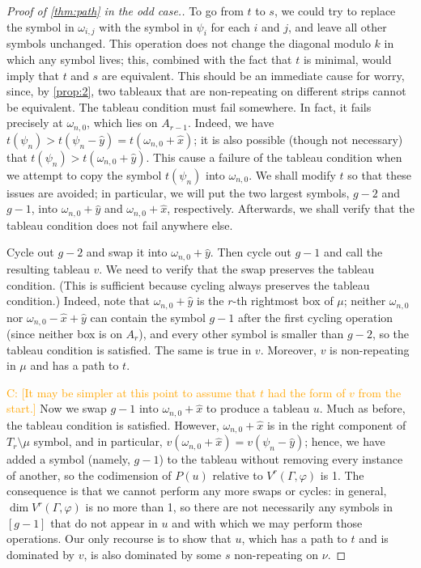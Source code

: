 \documentclass[11pt,reqno]{amsart}
\newcommand{\caelan}[1]{\textcolor{orange}{\sf C: [#1]}}
\theoremstyle{definition}
\theoremstyle{problem}
\theoremstyle{plain}
\theoremstyle{remark}
\theoremstyle{theorem}
\numberwithin{equation}{section}
\numberwithin{figure}{section}
\theoremstyle{definition}
\theoremstyle{problem}
\theoremstyle{plain}
\begin{document}
\begin{proof}[Proof of \cref{thm:path} in the odd case.]
  To go from $t$ to $s$, we could try to replace the symbol in
  $\omega_{i,j}$ with the symbol in $\psi_i$ for each $i$ and $j$, and
  leave all other symbols unchanged.  This operation does not change
  the diagonal modulo $k$ in which any symbol lives; this, combined
  with the fact that $t$ is minimal, would imply that $t$ and $s$ are
  equivalent.  This should be an immediate cause for worry, since, by
  \cref{prop:2}, two tableaux that are non-repeating on different
  strips cannot be equivalent.  The tableau condition must fail
  somewhere.  In fact, it fails precisely at $\omega_{n,0}$, which
  lies on $A_{r-1}$.  Indeed, we have
  $t(\psi_n) > t(\psi_n - \hat y) = t(\omega_{n,0}+ \hat x)$; it is
  also possible (though not necessary) that
  $t(\psi_n) > t(\omega_{n,0} + \hat y)$.  This cause a failure of the
  tableau condition when we attempt to copy the symbol $t(\psi_n)$
  into $\omega_{n,0}$.  We shall modify $t$ so that these issues are
  avoided; in particular, we will put the two largest symbols, $g-2$
  and $g-1$, into $\omega_{n,0} + \hat y$ and $\omega_{n,0} + \hat x$,
  respectively.  Afterwards, we shall verify that the tableau
  condition does not fail anywhere else.

  Cycle out $g-2$ and swap it into $\omega_{n,0} + \hat y$.  Then
  cycle out $g-1$ and call the resulting tableau $v$.  We need to
  verify that the swap preserves the tableau condition.  (This is
  sufficient because cycling always preserves the tableau condition.)
  Indeed, note that $\omega_{n,0} + \hat y$ is the $r$-th rightmost
  box of $\mu$; neither $\omega_{n,0}$ nor
  $\omega_{n,0} - \hat x + \hat y$ can contain the symbol $g-1$ after
  the first cycling operation (since neither box is on $A_r$), and
  every other symbol is smaller than $g-2$, so the tableau condition
  is satisfied.  The same is true in $v$.  Moreover, $v$ is
  non-repeating in $\mu$ and has a path to $t$.

  \caelan{It may be simpler at this point to assume that $t$ had the
    form of $v$ from the start.}  Now we swap $g-1$ into
  $\omega_{n,0} + \hat x$ to produce a tableau $u$.  Much as before,
  the tableau condition is satisfied.  However,
  $\omega_{n,0} + \hat x$ is in the right component of
  $T_r \setminus \mu$ symbol, and in particular,
  $v(\omega_{n,0} + \hat x) = v(\psi_n - \hat y)$; hence, we have
  added a symbol (namely, $g-1$) to the tableau without removing every
  instance of another, so the codimension of $P(u)$ relative to
  $V^r(\Gamma,\varphi)$ is 1.  The consequence is that we cannot
  perform any more swaps or cycles: in general,
  $\dim V^r(\Gamma,\varphi)$ is no more than 1, so there are not
  necessarily any symbols in $[g-1]$ that do not appear in $u$ and
  with which we may perform those operations.  Our only recourse is to
  show that $u$, which has a path to $t$ and is dominated by
  $v$, is also dominated by some $s$ non-repeating on $\nu$.


\end{proof}
\end{document}
